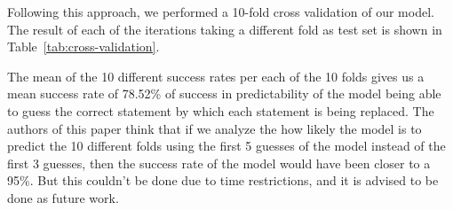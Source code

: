 
Following this approach, we performed a 10-fold cross validation of our model. The result of each of the iterations taking a different fold as test set is shown in Table~\ref{tab:cross-validation}.


\begin{table*}
	\centering
\caption{10-fold cross validation of the probabilistic model}
\label{tab:cross-validation}
\end{table*}

The mean of the 10 different success rates per each of the 10 folds gives us a mean success rate of 78.52\% of success in predictability of the model being able to guess the correct statement by which each statement is being replaced.  
The authors of this paper think that if we analyze the how likely the model is to predict the 10 different folds using the first 5 guesses of the model instead of the first 3 guesses, then the success rate of the model would have been closer to a 95\%. But this couldn't be done due to time restrictions, and it is advised to be done as future work.
